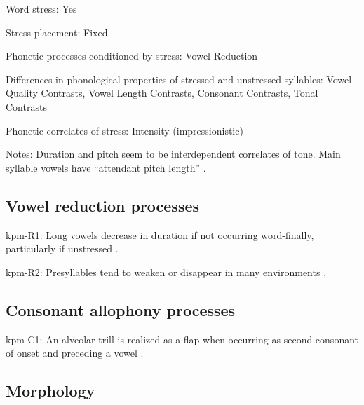 {\begin{appendixdesc}
\item[Word stress:] Yes

\item[Stress placement:] Fixed

\item[Phonetic processes conditioned by stress:] Vowel Reduction

\item[Differences in phonological properties of stressed and unstressed syllables:] Vowel Quality Contrasts, Vowel Length Contrasts, Consonant Contrasts, Tonal Contrasts

\item[Phonetic correlates of stress:] Intensity (impressionistic)

\item[Notes:] Duration and pitch seem to be interdependent correlates of tone. Main syllable vowels have “attendant pitch length” \citep[32]{Olsen2014}.
\end{appendixdesc}
\subsection*{Vowel reduction processes}
\begin{appendixdesc}

\item[kpm-R1:]  Long vowels decrease in duration if not occurring word-finally, particularly if unstressed \citep[33]{Olsen2014}.

\item[kpm-R2:] Presyllables tend to weaken or disappear in many environments \citep[31]{Olsen2014}.
\end{appendixdesc}
\subsection*{Consonant allophony processes}
\begin{appendixdesc}

\item[kpm-C1:] An alveolar trill is realized as a flap when occurring as second consonant of onset and preceding a vowel \citep[24]{Olsen2014}.
\end{appendixdesc}
\subsection*{Morphology}

\begin{appendixdesc}


\end{appendixdesc}}
